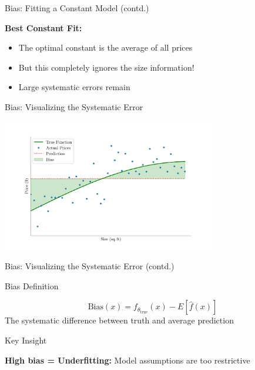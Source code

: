\documentclass[10pt]{beamer}
\newcommand{\fitpic}[1]{\begin{adjustbox}{max width=\linewidth, max totalheight=0.78\textheight}#1\end{adjustbox}}
\begin{document}

\begin{frame}{Bias: Fitting a Constant Model (contd.)}
\footnotesize
\begin{keypointsbox}
\raggedright
\textbf{Best Constant Fit:} 
\begin{itemize}
\item The optimal constant is the average of all prices
\item But this completely ignores the size information!
\item Large systematic errors remain
\end{itemize}
\end{keypointsbox}
\end{frame}


\begin{frame}{Bias: Visualizing the Systematic Error}
\footnotesize
\begin{center}
\fitpic{\includegraphics[width=0.7\textwidth]{../assets/bias-variance/figures/biasn_3_latexify.pdf}}
\end{center}
\end{frame}

\begin{frame}{Bias: Visualizing the Systematic Error (contd.)}
\footnotesize
\begin{definitionbox}{Bias Definition}
\raggedright
$$\text{Bias}(x) = f_{\theta_{\text{true}}}(x) - E[\hat{f}(x)]$$
The systematic difference between truth and average prediction
\end{definitionbox}

\begin{alertbox}{Key Insight}
\raggedright
\textbf{High bias = Underfitting:} Model assumptions are too restrictive
\end{alertbox}
\end{frame}
\end{document}
